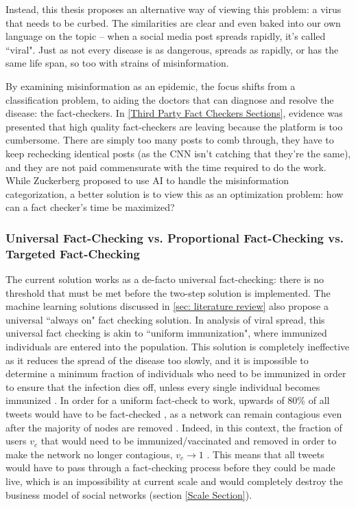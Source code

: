 \documentclass[preprint,review,12pt]{elsarticle}
\begin{document}
 Instead, this thesis proposes an alternative way of viewing this problem: a virus that needs to be curbed. The similarities are clear and even baked into our own language on the topic -- when a social media post spreads rapidly, it's called ``viral". Just as not every disease is as dangerous, spreads as rapidly, or has the same life span, so too with strains of misinformation.
 
 By examining misinformation as an epidemic, the focus shifts from a classification problem, to aiding the doctors that can diagnose and resolve the disease: the fact-checkers. In \ref{Third Party Fact Checkers Sections}, evidence was presented that high quality fact-checkers are leaving because the platform is too cumbersome. There are simply too many posts to comb through, they have to keep rechecking identical posts (as the CNN isn't catching that they're the same), and they are not paid commensurate with the time required to do the work. While Zuckerberg proposed to use AI to handle the misinformation categorization, a better solution is to view this as an optimization problem: how can a fact checker's time be maximized? 
 
 \subsubsection{Universal Fact-Checking vs. Proportional Fact-Checking vs. Targeted Fact-Checking}
 The current solution works as a de-facto universal fact-checking: there is no threshold that must be met before the two-step solution is implemented. The machine learning solutions discussed in \ref{sec: literature review} also propose a universal ``always on" fact checking solution. In analysis of viral spread, this universal fact checking is akin to ``uniform immunization", where immunized individuals are entered into the population. This solution is completely ineffective as it reduces the spread of the disease too slowly, and it is impossible to determine a minimum fraction of individuals who need to be immunized in order to ensure that the infection dies off, unless every single individual becomes immunized \cite{pastor2002epidemic,pastor2002immunization,anderson1992infectious}. In order for a uniform fact-check to work, upwards of 80\% of all tweets would have to be fact-checked \cite{may1984spatial,hethcote2014gonorrhea,hethcote2013modeling,hethcote1987epidemiological,albert2000error, pastor2001epidemic}, as a network can remain contagious even after the majority of nodes are removed \cite{cohen2000resilience}. Indeed, in this context, the fraction of users $v_c$ that would need to be immunized/vaccinated and removed in order to make the network no longer contagious, $v_c \rightarrow 1$ \cite{cohen2003efficient,strogatz2001exploring,albert2002statistical,dorogovtsev2002evolution,pastor2002immunization}.
 This means that all tweets would have to pass through a fact-checking process before they could be made live, which is an impossibility at current scale and would completely destroy the business model of social networks (section \ref{Scale Section}).
 
\end{document}
